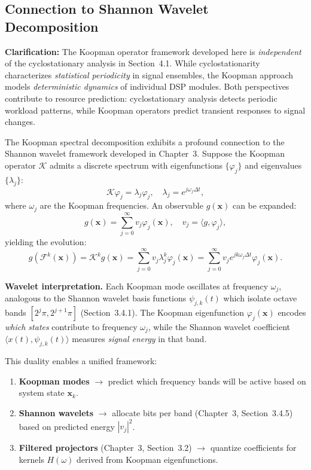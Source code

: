 \subsection{Connection to Shannon Wavelet Decomposition}

\noindent\textbf{Clarification:} The Koopman operator framework developed here is \emph{independent} of the cyclostationary analysis in Section~4.1. While cyclostationarity characterizes \emph{statistical periodicity} in signal ensembles, the Koopman approach models \emph{deterministic dynamics} of individual DSP modules. Both perspectives contribute to resource prediction: cyclostationary analysis detects periodic workload patterns, while Koopman operators predict transient responses to signal changes.

The Koopman spectral decomposition exhibits a profound connection to the Shannon wavelet framework developed in Chapter~3. Suppose the Koopman operator $\mathcal{K}$ admits a discrete spectrum with eigenfunctions $\{\varphi_j\}$ and eigenvalues $\{\lambda_j\}$:
\[
\mathcal{K} \varphi_j = \lambda_j \varphi_j, \quad \lambda_j = e^{j\omega_j \Delta t},
\]
where $\omega_j$ are the Koopman frequencies. An observable $g(\mathbf{x})$ can be expanded:
\[
g(\mathbf{x}) = \sum_{j=0}^\infty v_j \varphi_j(\mathbf{x}), \quad v_j = \langle g, \varphi_j \rangle,
\]
yielding the evolution:
\[
g(\mathcal{F}^k(\mathbf{x})) = \mathcal{K}^k g(\mathbf{x}) = \sum_{j=0}^\infty v_j \lambda_j^k \varphi_j(\mathbf{x}) = \sum_{j=0}^\infty v_j e^{jk\omega_j \Delta t} \varphi_j(\mathbf{x}).
\]

\noindent\textbf{Wavelet interpretation.} Each Koopman mode oscillates at frequency $\omega_j$, analogous to the Shannon wavelet basis functions $\psi_{j,k}(t)$ which isolate octave bands $[2^j\pi, 2^{j+1}\pi]$ (Section~3.4.1). The Koopman eigenfunction $\varphi_j(\mathbf{x})$ encodes \emph{which states} contribute to frequency $\omega_j$, while the Shannon wavelet coefficient $\langle x(t), \psi_{j,k}(t) \rangle$ measures \emph{signal energy} in that band.

This duality enables a unified framework:
\begin{enumerate}
\item \textbf{Koopman modes} $\to$ predict which frequency bands will be active based on system state $\mathbf{x}_k$.
\item \textbf{Shannon wavelets} $\to$ allocate bits per band (Chapter~3, Section~3.4.5) based on predicted energy $|v_j|^2$.
\item \textbf{Filtered projectors} (Chapter~3, Section~3.2) $\to$ quantize coefficients for kernels $H(\omega)$ derived from Koopman eigenfunctions.
\end{enumerate}

